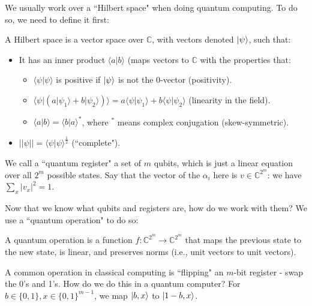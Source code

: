 \par We usually work over a ``Hilbert space" when doing quantum computing. To do so, we need to define it first:
\begin{definition}
A Hilbert space is a vector space over $\mathbb{C}$, with vectors denoted $\vert \psi \rangle$, such that:
\begin{itemize}
\item It has an inner product $\langle a \vert b \rangle$ (maps vectors to $\mathbb{C}$ with the properties that:
\begin{itemize}
\item $\langle \psi \vert \psi \rangle$ is positive if $\vert \psi \rangle$ is not the 0-vector (positivity).
\item $\langle \psi \vert (a \vert \psi_1 \rangle + b \vert \psi_2 \rangle) \rangle = a\langle \psi \vert \psi_1 \rangle + b \langle \psi \vert \psi_2 \rangle$ (linearity in the field).
\item $\langle a \vert b \rangle = \langle b \vert a \rangle^*$, where $^*$ means complex conjugation (skew-symmetric).
\end{itemize}
\item $||\psi|| = \langle \psi \vert \psi \rangle^{\frac{1}{2}}$ (``complete").
\end{itemize}
\end{definition}

We call a ``quantum register" a set of $m$ qubits, which is just a linear equation over all $2^m$ possible states. Say that the vector of the $\alpha_i$ here is $v \in \mathbb{C}^{2^m}$: we have $\sum_{x}|v_x|^2 = 1$. 

\par Now that we know what qubits and registers are, how do we work with them? We use a ``quantum operation" to do so:
\begin{definition}
A quantum operation is a function $f \colon \mathbb{C}^{2^m} \rightarrow \mathbb{C}^{2^m}$ that maps the previous state to the new state, is linear, and preserves norms (i.e., unit vectors to unit vectors).
\end{definition}

\begin{example}
A common operation in classical computing is ``flipping" an $m$-bit register - swap the 0's and 1's. How do we do this in a quantum computer? For $b \in \{0, 1\}, x \in \{0, 1\}^{m-1}$, we map $\vert b, x \rangle$ to $\vert 1-b, x \rangle$. 
\end{example}

